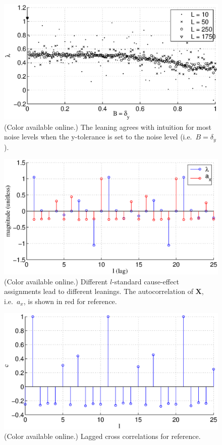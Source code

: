 \documentclass[a4paper,11pt,twocolumn]{article}
\begin{document}
\begin{figure}[ht]
\includegraphics[scale=0.45]{SimpleIRexample_Bxytol.eps}
\caption{(Color available online.) The leaning agrees with intuition for most noise levels when the y-tolerance is set to the noise level (i.e.\ $B=\delta_y$).}
\end{figure}
\begin{figure}[ht]
\includegraphics[scale=0.45]{SimpleIRexample_difflags.eps}
\caption{(Color available online.) Different $l$-standard cause-effect assignments lead to different leanings.  The autocorrelation of $\mathbf{X}$, i.e.\ $a_x$, is shown in red for reference.}
\end{figure}
\begin{figure}[ht]
\includegraphics[scale=0.45]{SimpleIRexample_lagcorr.eps}
\caption{(Color available online.) Lagged cross correlations for reference.}
\end{figure}
\end{document}
